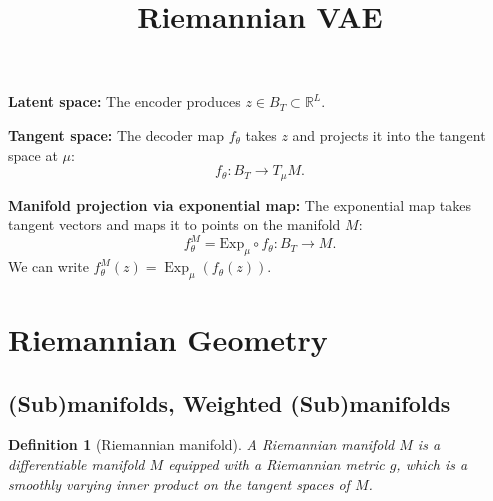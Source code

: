 \documentclass{article}
\title{Riemannian VAE}
\date{}
\newtheorem{definition}{Definition}
\begin{document}
\maketitle


{\color{red}
\textbf{Latent space:} The encoder produces $z \in B_T \subset \mathbb{R}^L$.

\textbf{Tangent space:} The decoder map $f_\theta$ takes $z$ and projects it into 
the tangent space at $\mu$:
\[
    f_\theta : B_T \to T_\mu M.
\]

\textbf{Manifold projection via exponential map:} The exponential map takes 
tangent vectors and maps it to points on the manifold $M$:
\[
    f^M_\theta = \mathrm{Exp}_\mu \circ f_\theta : B_T \to M.
\]
We can write $f_\theta^M(z)=\operatorname{Exp}_\mu\left(f_\theta(z)\right)$.
}




\section{Riemannian Geometry}
\subsection{(Sub)manifolds, Weighted (Sub)manifolds}

\begin{definition}[Riemannian manifold]
A Riemannian manifold \(M\) is a differentiable manifold \(M\) equipped with a Riemannian metric \(g\), which is a smoothly varying 
inner product on the tangent spaces of \(M\).
\end{definition}
\end{document}
